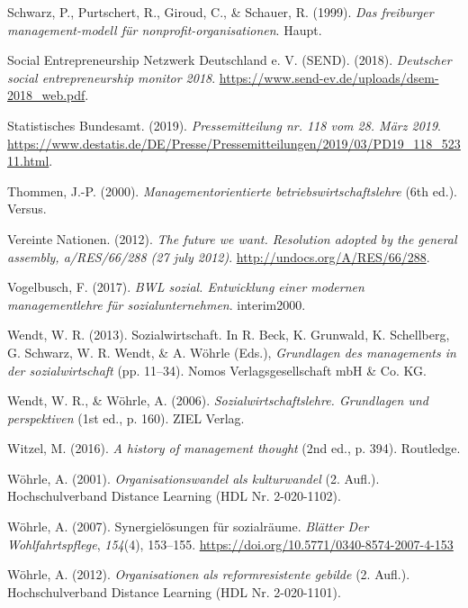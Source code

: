 \documentclass[
  letterpaper,
]{book}
\newlength{\cslhangindent}
\newenvironment{CSLReferences}[2] %
 {\begin{list}{}{%
  \setlength{\itemindent}{0pt}
  \setlength{\leftmargin}{0pt}
  \setlength{\parsep}{0pt}
  \ifodd #1
   \setlength{\leftmargin}{\cslhangindent}
   \setlength{\itemindent}{-1\cslhangindent}
  \fi
  \setlength{\itemsep}{#2\baselineskip}}}
 {\end{list}}
\begin{document}
\begin{CSLReferences}{1}{0}
Schwarz, P., Purtschert, R., Giroud, C., \& Schauer, R. (1999).
\emph{Das freiburger management-modell für nonprofit-organisationen}.
Haupt.

Social Entrepreneurship Netzwerk Deutschland e. V. (SEND). (2018).
\emph{Deutscher social entrepreneurship monitor 2018}.
\url{https://www.send-ev.de/uploads/dsem-2018_web.pdf}.

Statistisches Bundesamt. (2019). \emph{Pressemitteilung nr. 118 vom 28.
März 2019}.
\url{https://www.destatis.de/DE/Presse/Pressemitteilungen/2019/03/PD19_118_52311.html}.

Thommen, J.-P. (2000). \emph{Managementorientierte
betriebswirtschaftslehre} (6th ed.). Versus.

Vereinte Nationen. (2012). \emph{The future we want. Resolution adopted
by the general assembly, a/RES/66/288 (27 july 2012)}.
\url{http://undocs.org/A/RES/66/288}.

Vogelbusch, F. (2017). \emph{BWL sozial. Entwicklung einer modernen
managementlehre für sozialunternehmen}. interim2000.

Wendt, W. R. (2013). Sozialwirtschaft. In R. Beck, K. Grunwald, K.
Schellberg, G. Schwarz, W. R. Wendt, \& A. Wöhrle (Eds.),
\emph{Grundlagen des managements in der sozialwirtschaft} (pp. 11--34).
Nomos Verlagsgesellschaft mbH \& Co. KG.

Wendt, W. R., \& Wöhrle, A. (2006). \emph{Sozialwirtschaftslehre.
Grundlagen und perspektiven} (1st ed., p. 160). ZIEL Verlag.

Witzel, M. (2016). \emph{A history of management thought} (2nd ed., p.
394). Routledge.

Wöhrle, A. (2001). \emph{Organisationswandel als kulturwandel} (2.
Aufl.). Hochschulverband Distance Learning (HDL Nr. 2-020-1102).

Wöhrle, A. (2007). Synergielösungen für sozialräume. \emph{Blätter Der
Wohlfahrtspflege}, \emph{154}(4), 153--155.
\url{https://doi.org/10.5771/0340-8574-2007-4-153}

Wöhrle, A. (2012). \emph{Organisationen als reformresistente gebilde}
(2. Aufl.). Hochschulverband Distance Learning (HDL Nr. 2-020-1101).


\end{CSLReferences}
\end{document}
